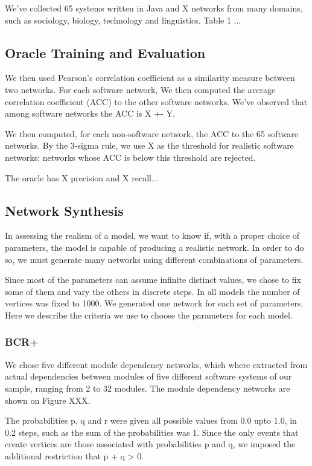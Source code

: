 We've collected 65 systems written in Java and X networks from many domains,
such as sociology, biology, technology and linguistics.
Table 1 ...

\subsection{Oracle Training and Evaluation}

We then used Pearson's correlation coefficient as a similarity measure between
two networks. For each software network, We then computed the average
correlation coefficient (ACC) to the other software networks. We've observed
that among software networks the ACC is X +- Y.

We then computed, for each non-software network, the ACC to the 65 software
networks. By the 3-sigma rule, we use X as the threshold for realistic software
networks: networks whose ACC is below this threshold are rejected.

The oracle has X precision and X recall...

\subsection{Network Synthesis}

In assessing the realism of a model, we want to know if, with a proper choice of
parameters, the model is capable of producing a realistic network. In order to
do so, we must generate many networks using different combinations of
parameters. 

Since most of the parameters can assume infinite distinct values, we chose to
fix some of them and vary the others in discrete steps. In all models the number
of vertices was fixed to 1000. We generated one network for each set of
parameters. Here we describe the criteria we use to choose the parameters for
each model.

\subsubsection{BCR+}

We chose five different module dependency networks, which where extracted from
actual dependencies between modules of five different software systems of our
sample, ranging from 2 to 32 modules. The module dependency networks are shown
on Figure XXX. 

The probabilities p, q and r were given all possible values from 0.0 upto 1.0,
in 0.2 steps, such as the sum of the probabilities was 1. Since the only events
that create vertices are those associated with probabilities p and q, we imposed
the additional restriction that p + q > 0.

